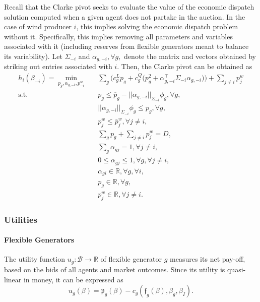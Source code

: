 \documentclass{article}
\begin{document}
Recall that the Clarke pivot seeks to evaluate the value of the economic dispatch solution computed when a given agent does not partake in the auction. In the case of wind producer $i$, this implies solving the economic dispatch problem without it. Specifically, this implies removing all parameters and variables associated with it (including reserves from flexible generators meant to balance its variability). Let $\Sigma_{-i}$ and $\alpha_{g, -i}, \forall g,$ denote the matrix and vectors obtained by striking out entries associated with $i$. Then, the Clarke pivot can be obtained as
\begin{align*}
h_i(\beta_{-i}) = \underset{p_g, \alpha_{g,-i}, p_{-i}^w}{\min} \hspace{10pt} & \sum_g \Big(c_g^L p_g + c_g^Q \big(p_g^2 + \alpha_{g,-i}^\top \Sigma_{-i} \alpha_{g,-i}\big)\Big) + \sum_{j \ne i} p_j^w \\
\mbox{s.t. } & p_g \le \overline{p}_g - ||\alpha_{g,-i}||_{\Sigma_{-i}} \phi_g,\forall g,\\
& ||\alpha_{g,-i}||_{\Sigma_{-i}} \phi_g \le p_g,\forall g,\\
& p_j^w \le \bar{p}_j^w, \forall j \ne i,\\
& \sum_g p_g + \sum_{j \ne i} p_j^w = D,\\
& \sum_g \alpha_{gj} = 1, \forall j \ne i,\\
& 0 \le \alpha_{gj} \le 1, \forall g, \forall j \ne i,\\
& \alpha_{gi} \in \mathbb{R}, \forall g, \forall i,\\
& p_g \in \mathbb{R}, \forall g,\\
& p_j^w \in \mathbb{R}, \forall j \ne i.
\end{align*}

\subsubsection{Utilities}

\paragraph{Flexible Generators} The utility function $u_g: \mathcal{B} \rightarrow \mathbb{R}$ of flexible generator $g$ measures its net pay-off, based on the bids of all agents and market outcomes. Since its utility is quasi-linear in money, it can be expressed as
\begin{equation*}
u_g(\beta) = \mathfrak{p}_g(\beta) - c_g(\mathfrak{f}_g(\beta), \beta_g, \beta_I).
\end{equation*}
\end{document}
